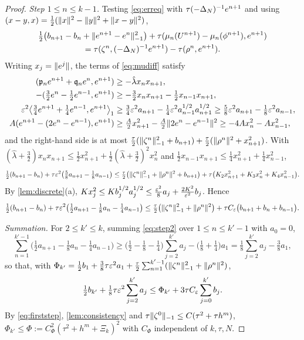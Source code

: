 \begin{proof}
\emph{Step $1\le n\le k-1$.} Testing \eqref{eq:erreq} with $\tau(-\Delta_N)^{-1}e^{n+1}$ and using $(x-y,x)=\frac12(\lVert x\rVert^2-\lVert y\rVert^2+\lVert x-y\rVert^2)$,
\begin{multline*}
\tfrac12\big(b_{n+1}-b_n+\lVert e^{n+1}-e^n\rVert_{-1}^2\big)+\tau(\mu_n(U^{n+1})-\mu_n(\phi^{n+1}),e^{n+1})\\=\tau(\zeta^n,(-\Delta_N)^{-1}e^{n+1})-\tau(\rho^n,e^{n+1}) .
\end{multline*}
Writing $x_j=\lVert e^j\rVert$, the terms of \eqref{eq:mudiff} satisfy
\begin{align*}
(\mathfrak p_ne^{n+1}+\mathfrak q_ne^n,e^{n+1})&\ge-\hat\lambda x_nx_{n+1},\\
-(\tfrac32e^n-\tfrac12e^{n-1},e^{n+1})&\ge-\tfrac32x_nx_{n+1}-\tfrac12x_{n-1}x_{n+1},\\
\varepsilon^2\big\langle\tfrac34e^{n+1}+\tfrac14e^{n-1},e^{n+1}\big\rangle_1&\ge\tfrac34\varepsilon^2a_{n+1}-\tfrac14\varepsilon^2a_{n-1}^{1/2}a_{n+1}^{1/2}\ge\tfrac58\varepsilon^2a_{n+1}-\tfrac18\varepsilon^2a_{n-1},\\
A(e^{n+1}-(2e^n-e^{n-1}),e^{n+1})&\ge\tfrac A2x_{n+1}^2-\tfrac A2\lVert 2e^n-e^{n-1}\rVert^2\ge-4Ax_n^2-Ax_{n-1}^2,
\end{align*}
and the right-hand side is at most $\frac\tau2(\lVert \zeta^n\rVert_{-1}^2+b_{n+1})+\frac\tau2(\lVert \rho^n\rVert^2+x_{n+1}^2)$. With $(\hat\lambda+\frac32)x_nx_{n+1}\le\frac12x_{n+1}^2+\frac12(\hat\lambda+\frac32)^2x_n^2$ and $\frac12x_{n-1}x_{n+1}\le\frac14x_{n+1}^2+\frac14x_{n-1}^2$,
\begin{equation}\label{eq:step1}
\tfrac12(b_{n+1}-b_n)+\tau\varepsilon^2\big(\tfrac58a_{n+1}-\tfrac18a_{n-1}\big)\le\tfrac\tau2\big(\lVert \zeta^n\rVert_{-1}^2+\lVert \rho^n\rVert^2+b_{n+1}\big)+\tau\big(K_2x_{n+1}^2+K_3x_n^2+K_4x_{n-1}^2\big).
\end{equation}
By \cref{lem:discrete}(a), $Kx_j^2\le Kb_j^{1/2}a_j^{1/2}\le\frac{\varepsilon^2}8a_j+\frac{2K^2}{\varepsilon^2}b_j$. Hence
\begin{equation}\label{eq:step2}
\tfrac12(b_{n+1}-b_n)+\tau\varepsilon^2\big(\tfrac12a_{n+1}-\tfrac18a_n-\tfrac14a_{n-1}\big)\le\tfrac\tau2\big(\lVert \zeta^n\rVert_{-1}^2+\lVert \rho^n\rVert^2\big)+\tau C_\varepsilon\big(b_{n+1}+b_n+b_{n-1}\big).
\end{equation}

\emph{Summation.} For $2\le k'\le k$, summing \eqref{eq:step2} over $1\le n\le k'-1$ with $a_0=0$,
\[
\sum_{n=1}^{k'-1}\big(\tfrac12a_{n+1}-\tfrac18a_n-\tfrac14a_{n-1}\big)\ge\big(\tfrac12-\tfrac18-\tfrac14\big)\sum_{j=2}^{k'}a_j-\big(\tfrac18+\tfrac14\big)a_1=\tfrac18\sum_{j=2}^{k'}a_j-\tfrac38a_1,
\]
so that, with $\Phi_{k'}=\frac12b_1+\frac38\tau\varepsilon^2a_1+\frac\tau2\sum_{n=1}^{k'-1}(\lVert \zeta^n\rVert_{-1}^2+\lVert \rho^n\rVert^2)$,
\begin{equation}\label{eq:summed}
\tfrac12b_{k'}+\tfrac18\tau\varepsilon^2\sum_{j=2}^{k'}a_j\le\Phi_{k'}+3\tau C_\varepsilon\sum_{j=0}^{k'}b_j .
\end{equation}
By \eqref{eq:firststep}, \cref{lem:consistency} and $\tau\lVert \zeta^0\rVert_{-1}\le C(\tau^2+\tau h^m)$, $\Phi_{k'}\le\Phi:=C_\Phi^2(\tau^2+h^m+\Xi_k)^2$ with $C_\Phi$ independent of $k,\tau,N$.


\end{proof}
